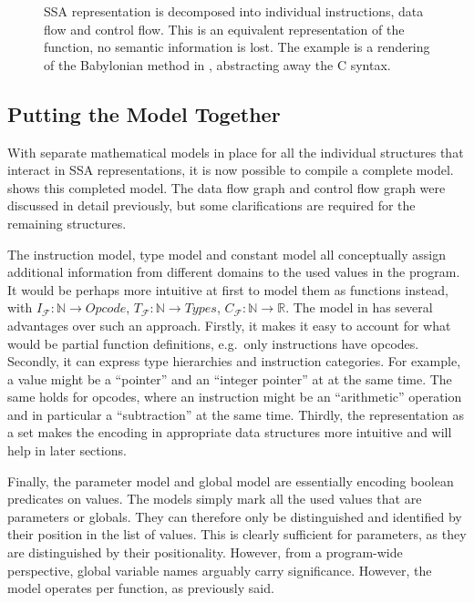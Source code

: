 \begin{figure}[p]

\caption{SSA representation is decomposed into individual instructions, data
         flow and control flow.
         This is an equivalent representation of the function, no semantic
         information is lost.
         The example is a rendering of the Babylonian method in
         , abstracting away the C syntax.}
\label{fig:separation}
\end{figure}

\subsection{Putting the Model Together}

\begin{figure}[p]
    
\end{figure}

    With separate mathematical models in place for all the individual structures
    that interact in SSA representations, it is now possible to compile a
    complete model.
     shows this completed model.
    The data flow graph and control flow graph were discussed in detail
    previously, but some clarifications are required for the remaining
    structures.

    The instruction model, type model and constant model all conceptually assign
    additional information from different domains to the used values in the
    program.
    It would be perhaps more intuitive at first to model them as functions
    instead, with $I_\mathcal F\colon\mathbb N\rightarrow Opcode$,
    $T_\mathcal F\colon\mathbb N\rightarrow Types$,
    $C_\mathcal F\colon\mathbb N\rightarrow \mathbb R$.
    The model in  has several advantages over such an
    approach.
    Firstly, it makes it easy to account for what would be partial function
    definitions, e.g.\ only instructions have opcodes.
    Secondly, it can express type hierarchies and instruction categories.
    For example, a value might be a ``pointer'' and an ``integer pointer'' at
    at the same time.
    The same holds for opcodes, where an instruction might be an ``arithmetic''
    operation and in particular a ``subtraction'' at the same time.
    Thirdly, the representation as a set makes the encoding in appropriate data
    structures more intuitive and will help in later sections.

    Finally, the parameter model and global model are essentially encoding
    boolean predicates on values.
    The models simply mark all the used values that are parameters or globals.
    They can therefore only be distinguished and identified by their position
    in the list of values.
    This is clearly sufficient for parameters, as they are distinguished by
    their positionality.
    However, from a program-wide perspective, global variable names arguably
    carry significance.
    However, the model operates per function, as previously said.

